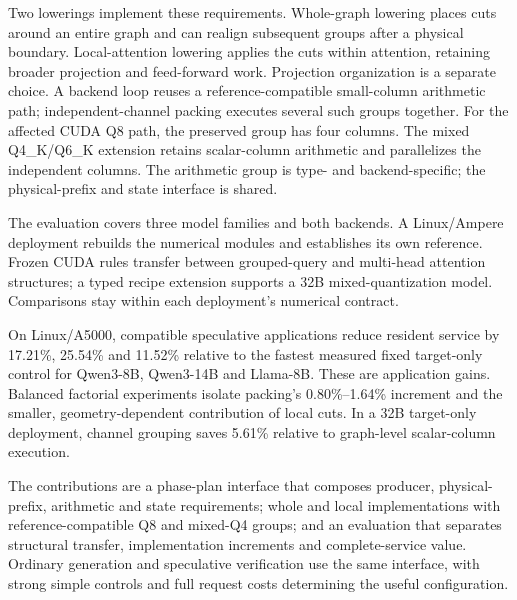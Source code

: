Two lowerings implement these requirements. Whole-graph lowering places cuts around an entire graph and can realign subsequent groups after a physical boundary. Local-attention lowering applies the cuts within attention, retaining broader projection and feed-forward work. Projection organization is a separate choice. A backend loop reuses a reference-compatible small-column arithmetic path; independent-channel packing executes several such groups together. For the affected CUDA Q8 path, the preserved group has four columns. The mixed Q4\_K/Q6\_K extension retains scalar-column arithmetic and parallelizes the independent columns. The arithmetic group is type- and backend-specific; the physical-prefix and state interface is shared.

The evaluation covers three model families and both backends. A Linux/Ampere deployment rebuilds the numerical modules and establishes its own reference. Frozen CUDA rules transfer between grouped-query and multi-head attention structures; a typed recipe extension supports a 32B mixed-quantization model. Comparisons stay within each deployment's numerical contract.

On Linux/A5000, compatible speculative applications reduce resident service by 17.21\%, 25.54\% and 11.52\% relative to the fastest measured fixed target-only control for Qwen3-8B, Qwen3-14B and Llama-8B. These are application gains. Balanced factorial experiments isolate packing's 0.80\%--1.64\% increment and the smaller, geometry-dependent contribution of local cuts. In a 32B target-only deployment, channel grouping saves 5.61\% relative to graph-level scalar-column execution.

The contributions are a phase-plan interface that composes producer, physical-prefix, arithmetic and state requirements; whole and local implementations with reference-compatible Q8 and mixed-Q4 groups; and an evaluation that separates structural transfer, implementation increments and complete-service value. Ordinary generation and speculative verification use the same interface, with strong simple controls and full request costs determining the useful configuration.
